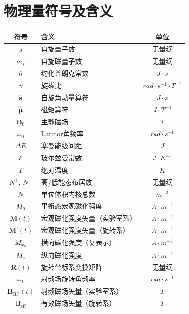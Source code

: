 \documentclass[12pt]{article}
\begin{document}
\section{物理量符号及含义}
\begin{table}[h]
    \centering
    \begin{tabularx}{\textwidth}{c X c}
        \toprule
        \textbf{符号} & \textbf{含义} & \textbf{单位} \\
        \midrule
        $s$ & 自旋量子数 & 无量纲 \\
        $m_s$ & 自旋磁量子数 & 无量纲 \\
        $\hbar$ & 约化普朗克常数 & $\si{J\cdot s}$ \\
        $\gamma$ & 旋磁比 & $\si{rad\cdot s^{-1}\cdot T^{-1}}$ \\
        $\hat{\bm{s}}$ & 自旋角动量算符 & $\si{J\cdot s}$ \\
        $\hat{\bm{\mu}}$ & 磁矩算符 & $\si{J\cdot T^{-1}}$ \\
        $\bm{B}_0$ & 主静磁场 & $\si{T}$ \\
        $\omega_0$ & Larmor角频率 & $\si{rad\cdot s^{-1}}$ \\
        $\Delta E$ & 塞曼能级间距 & $\si{J}$ \\
        $k$ & 玻尔兹曼常数 & $\si{J\cdot K^{-1}}$ \\
        $T$ & 绝对温度 & $\si{K}$ \\
        $N^+$, $N^-$ & 高/低能态布居数 & 无量纲 \\
        $N$ & 单位体积内核总数 & $\si{m^{-3}}$ \\
        $M_0$ & 平衡态宏观磁化强度 & $\si{A\cdot m^{-1}}$ \\
        $\bm{M}(t)$ & 宏观磁化强度矢量（实验室系） & $\si{A\cdot m^{-1}}$ \\
        $\bm{M}'(t)$ & 宏观磁化强度矢量（旋转系） & $\si{A\cdot m^{-1}}$ \\
        $M_{xy}$ & 横向磁化强度（复表示） & $\si{A\cdot m^{-1}}$ \\
        $M_z$ & 纵向磁化强度 & $\si{A\cdot m^{-1}}$ \\
        $\mathbf{R}(t)$ & 旋转坐标系变换矩阵 & 无量纲 \\
        $\omega_1$ & 射频场旋转角频率 & $\si{rad\cdot s^{-1}}$ \\
        $\bm{B}_{\mathrm{RF}}(t)$ & 射频磁场矢量（实验室系） & $\si{T}$ \\
        $\bm{B}_{\mathrm{eff}}$ & 有效磁场矢量（旋转系） & $\si{T}$ \\

\end{tabularx}
\end{table}
\end{document}
